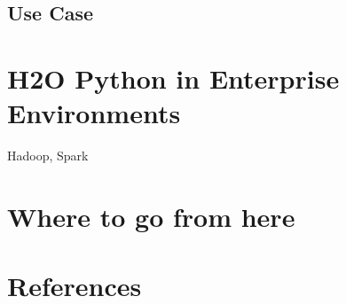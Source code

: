 \subsection{Use Case}

\section{H2O Python in Enterprise Environments}
Hadoop, Spark

\section{Where to go from here}


\newpage
\section{References}








\enddocument